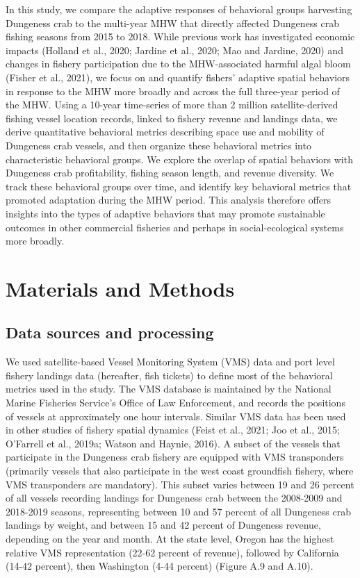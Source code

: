 \documentclass[]{elsarticle} %
\begin{document}
In this study, we compare the adaptive responses of behavioral groups
harvesting Dungeness crab to the multi-year MHW that directly affected
Dungeness crab fishing seasons from 2015 to 2018. While previous work
has investigated economic impacts (Holland et al., 2020; Jardine et al.,
2020; Mao and Jardine, 2020) and changes in fishery participation due to
the MHW-associated harmful algal bloom (Fisher et al., 2021), we focus
on and quantify fishers' adaptive spatial behaviors in response to the
MHW more broadly and across the full three-year period of the MHW. Using
a 10-year time-series of more than 2 million satellite-derived fishing
vessel location records, linked to fishery revenue and landings data, we
derive quantitative behavioral metrics describing space use and mobility
of Dungeness crab vessels, and then organize these behavioral metrics
into characteristic behavioral groups. We explore the overlap of spatial
behaviors with Dungeness crab profitability, fishing season length, and
revenue diversity. We track these behavioral groups over time, and
identify key behavioral metrics that promoted adaptation during the MHW
period. This analysis therefore offers insights into the types of
adaptive behaviors that may promote sustainable outcomes in other
commercial fisheries and perhaps in social-ecological systems more
broadly.

\hypertarget{methods}{%
\section{Materials and Methods}\label{methods}}

\hypertarget{data-sources-and-processing}{%
\subsection{Data sources and
processing}\label{data-sources-and-processing}}

We used satellite-based Vessel Monitoring System (VMS) data and port
level fishery landings data (hereafter, fish tickets) to define most of
the behavioral metrics used in the study. The VMS database is maintained
by the National Marine Fisheries Service's Office of Law Enforcement,
and records the positions of vessels at approximately one hour
intervals. Similar VMS data has been used in other studies of fishery
spatial dynamics (Feist et al., 2021; Joo et al., 2015; O'Farrell et
al., 2019a; Watson and Haynie, 2016). A subset of the vessels that
participate in the Dungeness crab fishery are equipped with VMS
transponders (primarily vessels that also participate in the west coast
groundfish fishery, where VMS transponders are mandatory). This subset
varies between 19 and 26 percent of all vessels recording landings for
Dungeness crab between the 2008-2009 and 2018-2019 seasons, representing
between 10 and 57 percent of all Dungeness crab landings by weight, and
between 15 and 42 percent of Dungeness revenue, depending on the year
and month. At the state level, Oregon has the highest relative VMS
representation (22-62 percent of revenue), followed by California (14-42
percent), then Washington (4-44 percent) (Figure A.9 and A.10).
\end{document}
